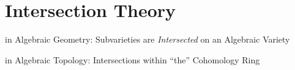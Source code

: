 \section{Intersection Theory}\label{sec:intersection_theory}

in Algebraic Geometry: Subvarieties are \emph{Intersected} on an
Algebraic Variety

in Algebraic Topology: Intersections within ``the'' Cohomology Ring
